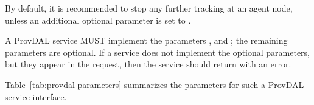 By default, it is recommended to stop any further tracking at an agent node, unless an additional optional parameter  is set to .




A ProvDAL service MUST implement the parameters ,  and ; the remaining parameters are optional.
If a service does not implement the optional parameters, but they appear in the request, then the service should return with an error.

Table~\ref{tab:provdal-parameters} summarizes the parameters for such a ProvDAL service interface.

